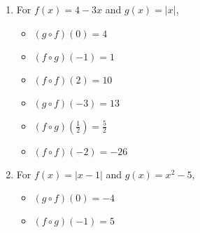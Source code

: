 \begin{enumerate}
\begin{multicols}{3}
\begin{itemize}
\item  $(g\circ f)(-3) = -48$

\item  $(f\circ g)\left(\frac{1}{2}\right) = \frac{13}{4}$

\item  $(f \circ f)(-2) = -2$

\end{itemize}

\end{multicols}

\item  For   $f(x) = 4-3x$ and  $g(x) = |x|$,
\begin{multicols}{3}

\begin{itemize}

\item  $(g\circ f)(0) = 4$

\item  $(f\circ g)(-1) = 1$

\item  $(f \circ f)(2) = 10$

\end{itemize}

\end{multicols}

\begin{multicols}{3}

\begin{itemize}

\item  $(g\circ f)(-3) = 13$

\item  $(f\circ g)\left(\frac{1}{2}\right) = \frac{5}{2}$

\item  $(f \circ f)(-2) = -26$

\end{itemize}

\end{multicols}

\item  For   $f(x) = |x-1|$ and $g(x) = x^2-5$,
\begin{multicols}{3}

\begin{itemize}

\item  $(g\circ f)(0) = -4$

\item  $(f\circ g)(-1) = 5$


\end{itemize}
\end{multicols}
\end{enumerate}
